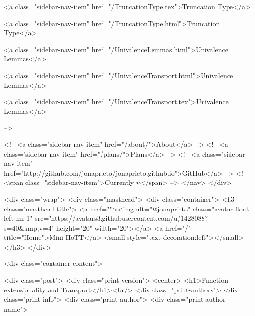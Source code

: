       
    
      
        
          <a class="sidebar-nav-item" href="/TruncationType.tex">Truncation Type</a>
        
      
    
      
        
          <a class="sidebar-nav-item" href="/TruncationType.html">Truncation Type</a>
        
      
    
      
        
          <a class="sidebar-nav-item" href="/UnivalenceLemmas.html">Univalence Lemmas</a>
        
      
    
      
        
          <a class="sidebar-nav-item" href="/UnivalenceTransport.html">Univalence Lemmas</a>
        
      
    
      
        
          <a class="sidebar-nav-item" href="/UnivalenceTransport.tex">Univalence Lemmas</a>
        
      
     -->

    <!-- <a class="sidebar-nav-item" href="/about/">About</a> -->
    <!-- <a class="sidebar-nav-item" href="/plans/">Plans</a> -->
    <!-- <a class="sidebar-nav-item" href="http://github.com/jonaprieto/jonaprieto.github.io">GitHub</a> -->
    <!-- <span class="sidebar-nav-item">Currently v</span> -->
  </nav>
</div>

    <div class="wrap">
      <div class="masthead">
        <div class="container">
          <h3 class="masthead-title">
            <a href=""><img alt="@jonaprieto" class="avatar float-left mr-1" src="https://avatars3.githubusercontent.com/u/1428088?s=40&amp;v=4" height="20" width="20"></a>
            <a href="/" title="Home">Mini-HoTT</a>
            <small style="text-decoration:left"></small>
          </h3>
        </div>
      
      <div class="container content">
        







<div class="post">
  <div class="print-version">
    <center>
      <h1>Function extensionality and Transport</h1><br/>
        <div class="print-authors">
          <div class="print-info">
            <div class="print-author">
              <div class="print-author-name">
                
